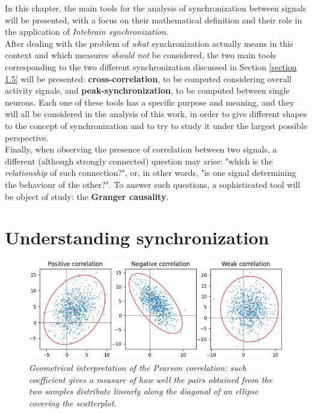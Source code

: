 \documentclass[12pt, a4paper]{report}
\begin{document}
In this chapter, the main tools for the analysis of synchronization between signals will be presented, with a focus on their mathematical definition and their role in the application of \textit{Intebrain synchronization}.\\
After dealing with the problem of \textit{what} synchronization actually means in this context and which measures \textit{should not} be considered, the two main tools corresponding to the two different synchronization discussed in Section \ref{section 1.5} will be presented:\textbf{ cross-correlation}, to be computed considering overall activity signals, and \textbf{peak-synchronization}, to be computed between single neurons. Each one of these tools has a specific purpose and meaning, and they will all be considered in the analysis of this work, in order to give different shapes to the concept of synchronization and to try to study it under the largest possible perspective.\\
Finally, when observing the presence of correlation between two signals, a different (although strongly connected) question may arise: "which is the \textit{relationship} of such connection?", or, in other words, "is one signal determining the behaviour of the other?". To answer such questions, a sophisticated tool will be object of study: the \textbf{Granger causality}.


\section{Understanding synchronization}

\begin{figure}[H]
	\begin{center}
		\includegraphics[scale=.75]{pearson.png} 
	\end{center} 
	\caption{\textit{Geometrical interpretation of the Pearson correlation: such coefficient gives a measure of how well the pairs obtained from the two samples distribute linearly along the diagonal of an ellipse covering the scatterplot. \cite{46}}} \label{pearson figure}
	
\end{figure}
\end{document}
